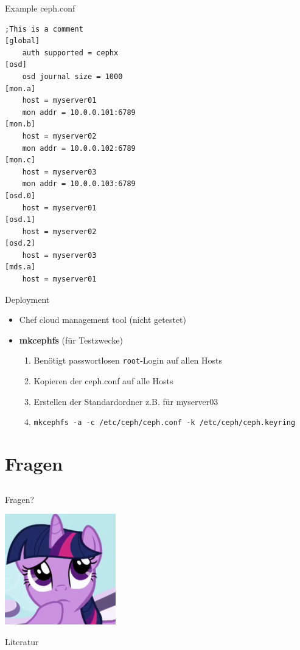 \documentclass[notes=hide,yellow]{beamer}
\begin{document}
\begin{frame}[fragile]{Example ceph.conf}

\begin{lstlisting}
;This is a comment
[global]
	auth supported = cephx
[osd]
	osd journal size = 1000
[mon.a]
	host = myserver01
	mon addr = 10.0.0.101:6789
[mon.b]
	host = myserver02
	mon addr = 10.0.0.102:6789
[mon.c]
	host = myserver03
	mon addr = 10.0.0.103:6789
[osd.0]
	host = myserver01
[osd.1]
	host = myserver02
[osd.2]
	host = myserver03
[mds.a]
	host = myserver01
\end{lstlisting}
\end{frame}



\begin{frame}{Deployment}
	\begin{itemize}
		\item Chef cloud management tool (nicht getestet)
		\item \textbf{mkcephfs} (f\"ur Testzwecke)
			\begin{enumerate}
				\item Ben\"otigt passwortlosen \texttt{root}-Login auf allen Hosts
				\item Kopieren der ceph.conf auf alle Hosts
				\item Erstellen der Standardordner z.B. f\"ur myserver03
				\item \texttt{mkcephfs -a -c /etc/ceph/ceph.conf -k /etc/ceph/ceph.keyring}
			\end{enumerate}
	\end{itemize}
\end{frame}



\section{Fragen}
\subsection*{}
\begin{frame}
	\begin{center}
	\large Fragen?
	\end{center}
	
	\begin{center}
	\includegraphics[scale=0.8]{questions.jpg}
	\end{center}
\end{frame}



\begin{frame}{Literatur}
	
		
\end{frame}
\end{document}
